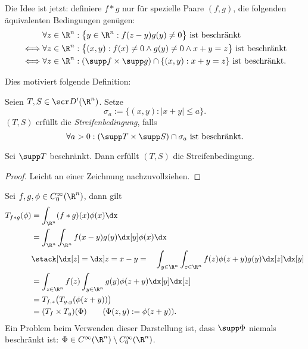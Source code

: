 Die Idee ist jetzt:
definiere $f \ast g$ nur für spezielle Paare $(f,g)$, die folgenden äquivalenten Bedingungen genügen:
\begin{align*}
	&\forall z \in \R^n : \big\{y \in \R^n : f(z-y) g(y) \neq 0 \big\} \text{ ist beschränkt} \\
	\iff &\forall z \in \R^n : \big\{(x,y) : f(x) \neq 0 \land g(y) \neq 0 \land x + y = z\big\} \text{ ist beschränkt} \\
	\iff &\forall z \in \R^n : (\supp f \times \supp g) \cap \{(x,y) : x+y = z \} \text{ ist beschränkt.}
\end{align*}

Dies motiviert folgende Definition:
\begin{df} \label{5.35}
	Seien $T, S \in \scr D'(\R^n)$.
	Setze
	\[
		\sigma_a := \{(x,y) : |x+y| \le a \}.
	\]
	$(T,S)$ erfüllt die \emph{Streifenbedingung}, falls
	\[
		\forall a > 0 :
		(\supp T \times \supp S) \cap \sigma_a
		\text{ ist beschränkt.}
	\]
\end{df}

\begin{ex} \label{5.36}
	Sei $\supp T$ beschränkt.
	Dann erfüllt $(T,S)$ die Streifenbedingung.
	\begin{proof}
		Leicht an einer Zeichnung nachzuvollziehen.
		\fixme[Zeichnung]
	\end{proof}
\end{ex}

\begin{nt} \label{5.37}
	Sei $f, g, \phi \in C_0^\infty(\R^n)$, dann gilt
	\begin{align*}
		T_{f\ast g}(\phi)
		&= \int_{\R^n} (f\ast g)(x)\phi(x) \dx \\
		&= \int_{\R^n} \int_{\R^n} f(x-y)g(y) \dx[y] \phi(x) \dx \\
		&\stack[{\dx[z]=\dx}]{z=x-y} =\quad \int_{y\in \R^n} \int_{z\in \R^n} f(z) \phi(z+y) g(y) \dx[z] \dx[y] \\
		&= \int_{z\in \R^n} f(z) \int_{y\in \R^n} g(y) \phi(z+y) \dx[y] \dx[z] \\
		&= T_{f,z} \big( T_{g,y} (\phi(z+y)) \big) \\
		&= (T_f \times T_g) (\Phi) \qquad (\Phi(z,y) := \phi(z+y)).
	\end{align*}
	Ein Problem beim Verwenden dieser Darstellung ist, dass $\supp \Phi$ niemals beschränkt ist: $\Phi \in C^\infty(\R^n) \setminus C_0^\infty(\R^n)$.
\end{nt}

